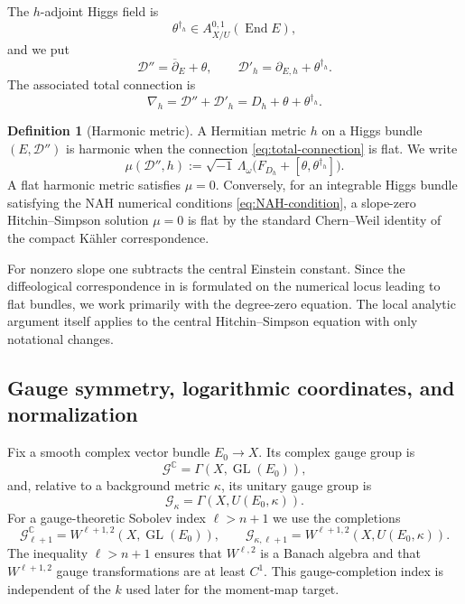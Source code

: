 \documentclass[11pt,reqno]{amsart}
\theoremstyle{definition}
\newtheorem{definition}[theorem]{Definition}
\theoremstyle{remark}
\newcommand{\C}{\mathbb C}
\newcommand{\cD}{\mathcal D}
\newcommand{\End}{\operatorname{End}}
\newcommand{\ddbar}{\overline\partial}
\newcommand{\Ggauge}{\mathscr G}
\begin{document}
The $h$-adjoint Higgs field is
\[
  \theta^{\dagger_h}\in A^{0,1}_{X/U}(\End E),
\]
and we put
\begin{equation}\label{eq:Dprime-Ddoubleprime}
  \cD''=\ddbar_E+\theta,
  \qquad
  \cD'_h=\partial_{E,h}+\theta^{\dagger_h}.
\end{equation}
The associated total connection is
\begin{equation}\label{eq:total-connection}
  \nabla_h=\cD''+\cD'_h
  =D_h+\theta+\theta^{\dagger_h}.
\end{equation}

\begin{definition}[Harmonic metric]\label{def:harmonic-metric}
A Hermitian metric $h$ on a Higgs bundle $(E,\cD'')$ is harmonic when the connection \eqref{eq:total-connection} is flat.  We write
\begin{equation}\label{eq:HS-equation}
  \mu(\cD'',h)
  :=\sqrt{-1}\,\Lambda_\omega
  \bigl(F_{D_h}+[\theta,\theta^{\dagger_h}]\bigr).
\end{equation}
A flat harmonic metric satisfies $\mu=0$.  Conversely, for an integrable Higgs bundle satisfying the NAH numerical conditions \eqref{eq:NAH-condition}, a slope-zero Hitchin--Simpson solution $\mu=0$ is flat by the standard Chern--Weil identity of the compact K\"ahler correspondence.
\end{definition}

For nonzero slope one subtracts the central Einstein constant.  Since the diffeological correspondence in \cite{AzamRayan2026} is formulated on the numerical locus leading to flat bundles, we work primarily with the degree-zero equation.  The local analytic argument itself applies to the central Hitchin--Simpson equation with only notational changes.

\subsection{Gauge symmetry, logarithmic coordinates, and normalization}

Fix a smooth complex vector bundle $E_0\to X$.  Its complex gauge group is
\[
  \Ggauge^{\C}=\Gamma(X,\operatorname{GL}(E_0)),
\]
and, relative to a background metric $\kappa$, its unitary gauge group is
\[
  \Ggauge_\kappa=\Gamma(X,U(E_0,\kappa)).
\]
For a gauge-theoretic Sobolev index $\ell>n+1$ we use the completions
\[
  \Ggauge^{\C}_{\ell+1}=W^{\ell+1,2}(X,\operatorname{GL}(E_0)),
  \qquad
  \Ggauge_{\kappa,\ell+1}=W^{\ell+1,2}(X,U(E_0,\kappa)).
\]
The inequality $\ell>n+1$ ensures that $W^{\ell,2}$ is a Banach
algebra and that $W^{\ell+1,2}$ gauge transformations are at least
$C^1$.  This gauge-completion index is independent of the $k$ used
later for the moment-map target.
\end{document}
